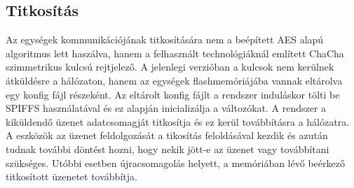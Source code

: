 \subsection{Titkosítás}
Az egységek kommunikációjának titkosítására nem a beépített AES alapú algoritmus lett haszálva, hanem a felhasznált technológiáknál említett ChaCha szimmetrikus kulcsú rejtjelező. A jelenlegi verzióban a kulcsok nem kerülnek átküldésre a hálózaton, hanem az egységek flashmemóriájába vannak eltárolva egy konfig fájl részeként. Az eltárolt konfig fájlt a rendszer induláskor tölti be SPIFFS használatával és ez alapján inicializálja a változókat.
A rendszer a kiküldendő üzenet adatcsomagját titkosítja és ez kerül továbbításra a hálózatra. A eszközök az üzenet feldolgozását a tikosítás feloldásával kezdik és azután tudnak további döntést hozni, hogy nekik jött-e az üzenet vagy továbbítani szükséges. Utóbbi esetben újracsomagolás helyett, a memóriában lévő beérkező titkosított üzenetet továbbítja.
